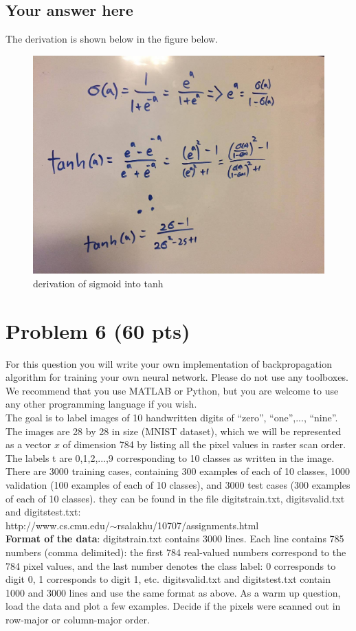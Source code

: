 \documentclass{article}
\begin{document}
\subsection*{Your answer here}

The derivation is shown below in the figure below.

\begin{figure}[h]
\centering
\includegraphics[width=.5\linewidth]{5.jpg}
\caption{derivation of sigmoid into tanh}
\label{fig:sigtan}
\end{figure}


\section*{Problem 6 (60 pts)}

For this question you will 
write your own implementation of backpropagation algorithm for 
training your own neural network.
Please do not use any toolboxes. 
We recommend that you use MATLAB or Python, but you are welcome
to use any other programming language if you wish. 
\\
 
The goal is to label images of
10 handwritten digits of ``zero'', ``one'',..., ``nine''.
The images are 28 by 28 in size (MNIST dataset), which we will be represented
as a vector $x$ of dimension 784 by listing all the pixel values in
raster scan order. The labels t are 0,1,2,...,9 corresponding to
10 classes as written in the image.
There are 3000 training cases, containing 300 examples of each of 10 
classes, 
1000 validation (100 examples of each of 10 classes), and 3000 
test cases (300 examples of each of 10 classes). 
they can be found in the file digitstrain.txt, digitsvalid.txt
 and digitstest.txt: \\
http://www.cs.cmu.edu/$\sim$rsalakhu/10707/assignments.html
\\

{\bf Format of the data}: digitstrain.txt contains 3000 lines.
Each line contains 785 numbers (comma delimited): 
the first 784 real-valued numbers
correspond to the
784 pixel values, and the last number denotes
the class label: 0 corresponds to digit 0, 1 corresponds to digit 1, etc. 
digitsvalid.txt and digitstest.txt contain 1000 and 3000 lines 
and use the same format as above.
As a warm up question, load the data and plot a few examples. Decide if the pixels were scanned out in row-major or column-major order.
\end{document}
